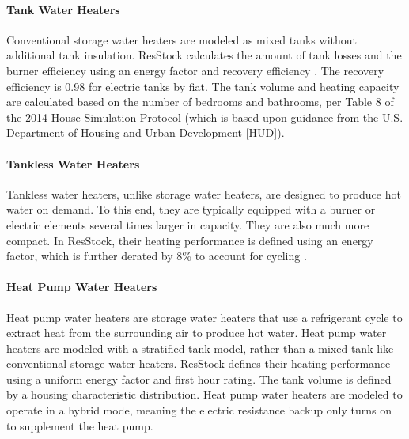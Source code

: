 \paragraph{Tank Water Heaters}
Conventional storage water heaters are modeled as mixed tanks without additional tank insulation. ResStock calculates the amount of tank losses and the burner efficiency using an energy factor and recovery efficiency \citep{tank_model_parameters}. The recovery efficiency is 0.98 for electric tanks by fiat. The tank volume and heating capacity are calculated based on the number of bedrooms and bathrooms, per Table 8 of the 2014 House Simulation Protocol (which is based upon guidance from the U.S. Department of Housing and Urban Development [HUD]).

\paragraph{Tankless Water Heaters}
Tankless water heaters, unlike storage water heaters, are designed to produce hot water on demand. To this end, they are typically equipped with a burner or electric elements several times larger in capacity. They are also much more compact. In ResStock, their heating performance is defined using an energy factor, which is further derated by 8\% to account for cycling \citep{ansi_resnet_301_2019}.

\paragraph{Heat Pump Water Heaters}
Heat pump water heaters are storage water heaters that use a refrigerant cycle to extract  heat from the surrounding air to produce hot water. Heat pump water heaters are modeled with a stratified tank model, rather than a mixed tank like conventional storage water heaters. ResStock defines their heating performance using a uniform energy factor and first hour rating.  The tank volume is defined by a housing characteristic distribution. Heat pump water heaters are modeled to operate in a hybrid mode, meaning the electric resistance backup only turns on to supplement the heat pump. 


